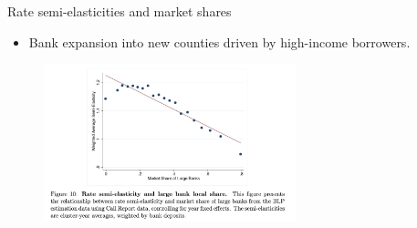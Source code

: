 \documentclass[notes,10pt, aspectratio=169]{beamer}
\begin{document}
    \begin{frame}{Rate semi-elasticities and market shares}

    \begin{itemize}
    \item Bank expansion into new counties driven by high-income borrowers.
    \end{itemize}
        \begin{figure}
            \centering
            \includegraphics[width=0.65\textwidth]{imgs/fig10.png}
        \end{figure}
        
\end{frame}
\end{document}
